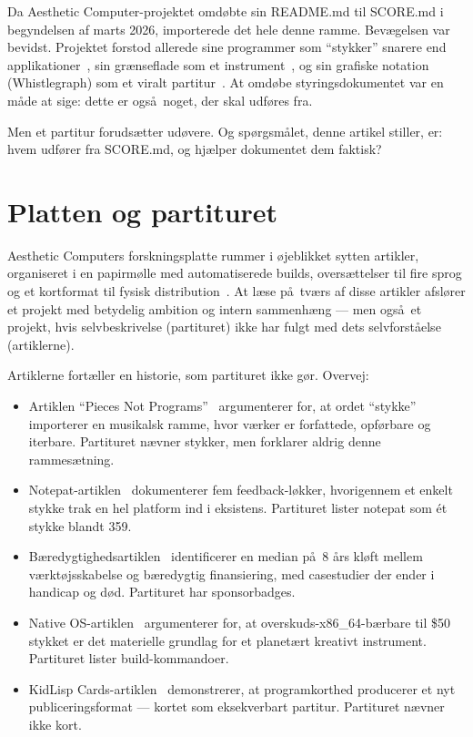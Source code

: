 \documentclass[10pt,letterpaper,twocolumn]{article}
\begin{document}
Da Aesthetic Computer-projektet omd\o bte sin README.md til SCORE.md i begyndelsen af marts 2026, importerede det hele denne ramme. Bev\ae gelsen var bevidst. Projektet forstod allerede sine programmer som ``stykker'' snarere end applikationer~\citep{scudder2026pieces}, sin gr\ae nseflade som et instrument~\citep{scudder2026notepat}, og sin grafiske notation (Whistlegraph) som et viralt partitur~\citep{scudder2026whistlegraph}. At omd\o be styringsdokumentet var en m\aa de at sige: dette er ogs\aa\ noget, der skal udf\o res fra.

Men et partitur foruds\ae tter ud\o vere. Og sp\o rgsm\aa let, denne artikel stiller, er: hvem udf\o rer fra SCORE.md, og hj\ae lper dokumentet dem faktisk?

\section{Platten og partituret}

Aesthetic Computers forskningsplatte rummer i \o jeblikket sytten artikler, organiseret i en papirm\o lle med automatiserede builds, overs\ae ttelser til fire sprog og et kortformat til fysisk distribution~\citep{scudder2026cards}. At l\ae se p\aa\ tv\ae rs af disse artikler afsl\o rer et projekt med betydelig ambition og intern sammenh\ae ng --- men ogs\aa\ et projekt, hvis selvbeskrivelse (partituret) ikke har fulgt med dets selvforst\aa else (artiklerne).

Artiklerne fort\ae ller en historie, som partituret ikke g\o r. Overvej:

\begin{itemize}
\item Artiklen ``Pieces Not Programs''~\citep{scudder2026pieces} argumenterer for, at ordet ``stykke'' importerer en musikalsk ramme, hvor v\ae rker er forfattede, opf\o rbare og iterbare. Partituret n\ae vner stykker, men forklarer aldrig denne rammes\ae tning.
\item Notepat-artiklen~\citep{scudder2026notepat} dokumenterer fem feedback-l\o kker, hvorigennem et enkelt stykke trak en hel platform ind i eksistens. Partituret lister notepat som \' et stykke blandt 359.
\item B\ae redygtighedsartiklen~\citep{scudder2026sustainability} identificerer en median p\aa\ 8 \aa rs kl\o ft mellem v\ae rkt\o jsskabelse og b\ae redygtig finansiering, med casestudier der ender i handicap og d\o d. Partituret har sponsorbadges.
\item Native OS-artiklen~\citep{scudder2026os} argumenterer for, at overskuds-x86\_64-b\ae rbare til \$50 stykket er det materielle grundlag for et planet\ae rt kreativt instrument. Partituret lister build-kommandoer.
\item KidLisp Cards-artiklen~\citep{scudder2026cards} demonstrerer, at programkorthed producerer et nyt publiceringsformat --- kortet som eksekverbart partitur. Partituret n\ae vner ikke kort.
\end{itemize}
\end{document}
